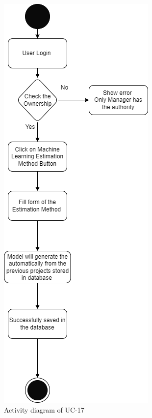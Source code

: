 \begin{figure}[H]
    \centering
    \includegraphics[scale=0.5]{./diagrams/Activity Diagram/ad-17.png}
    \caption{Activity diagram of UC-17}
    \label{fig:act-17}

\end{figure}


